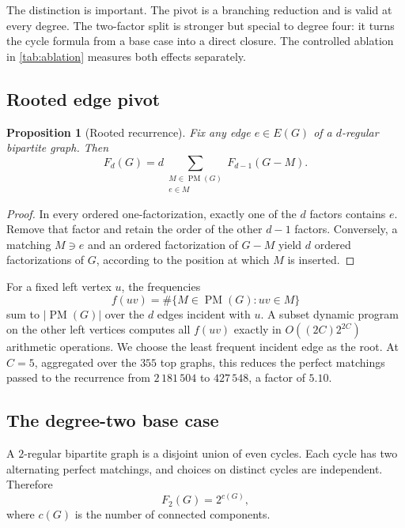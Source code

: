 \documentclass[11pt]{article}
\newtheorem{proposition}[theorem]{Proposition}
\theoremstyle{definition}
\theoremstyle{remark}
\newcommand{\PM}{\mathop{\mathrm{PM}}}
\begin{document}
The distinction is important.  The pivot is a branching reduction and is
valid at every degree.  The two-factor split is stronger but special to
degree four: it turns the cycle formula from a base case into a direct
closure.  The controlled ablation in \cref{tab:ablation} measures both effects
separately.

\subsection{Rooted edge pivot}

\begin{proposition}[Rooted recurrence]
Fix any edge $e\in E(G)$ of a $d$-regular bipartite graph.  Then
\begin{equation}
  F_d(G)=d\sum_{\substack{M\in\PM(G)\\e\in M}}F_{d-1}(G-M).
  \label{eq:rooted}
\end{equation}
\end{proposition}

\begin{proof}
In every ordered one-factorization, exactly one of the $d$ factors contains
$e$.  Remove that factor and retain the order of the other $d-1$ factors.
Conversely, a matching $M\ni e$ and an ordered factorization of $G-M$ yield
$d$ ordered factorizations of $G$, according to the position at which $M$ is
inserted.
\end{proof}

For a fixed left vertex $u$, the frequencies
\[
  f(uv)=\#\{M\in\PM(G):uv\in M\}
\]
sum to $|\PM(G)|$ over the $d$ edges incident with $u$.  A subset dynamic
program on the other left vertices computes all $f(uv)$ exactly in
$O((2C)2^{2C})$ arithmetic operations.  We choose the least frequent incident
edge as the root.  At $C=5$, aggregated over the $355$ top graphs, this reduces
the perfect matchings passed to the recurrence from $2\,181\,504$ to
$427\,548$, a factor of $5.10$.

\subsection{The degree-two base case}

A $2$-regular bipartite graph is a disjoint union of even cycles.  Each cycle
has two alternating perfect matchings, and choices on distinct cycles are
independent.  Therefore
\begin{equation}
  F_2(G)=2^{c(G)},
  \label{eq:f2}
\end{equation}
where $c(G)$ is the number of connected components.
\end{document}
